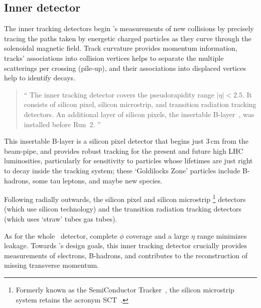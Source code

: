 

\subsection{Inner detector}
\label{sec:atlas_inner}
The inner tracking detectors begin \atlas's measurements of new collisions
by precisely tracing the paths taken by energetic charged particles
as they curve through the solenoidal magnetic field.
Track curvature provides momentum information,
tracks' associations into collision vertices helps to separate the multiple
scatterings per crossing (pile-up),
and their associations into displaced vertices help to identify
decays.
\begin{quote}
``%
The inner tracking detector covers the pseudorapidity range $|\eta| < 2.5$.
It consists of silicon pixel, silicon microstrip, and transition radiation
tracking detectors.
An additional layer of silicon pixels, the insertable
B-layer~\cite{ATLAS-TDR-19, PIX-2018-001}, was installed before Run~2.%
''~\cite{atlas2022searches}
\end{quote}
This insertable B-layer is a silicon pixel detector that begins just
$3\,\textrm{cm}$ from the beam-pipe, and provides robust tracking for the
present and future high LHC luminosities,
particularly for sensitivity to particles whose lifetimes are just right to
decay inside the tracking system;
these `Goldilocks Zone' particles include B-hadrons, some tau leptons, and
maybe new species.

Following radially outwards, the silicon pixel and silicon microstrip%
\footnote{%
Formerly known as the SemiConductor Tracker~\cite{atlas1999design1},
the silicon microstrip system retains the acronym
SCT~\cite{atlas2008experiment}.%
}
detectors (which use silicon technology)
and the transition radiation tracking detectors (which uses `straw' tubes
gas tubes).

As for the whole \atlas\ detector, complete $\phi$ coverage and a large $\eta$
range minimizes leakage.
Towards \atlas's design goals, this inner tracking detector crucially provides
measurements of electrons, B-hadrons, and contributes to the reconstruction of
missing transverse momentum.


